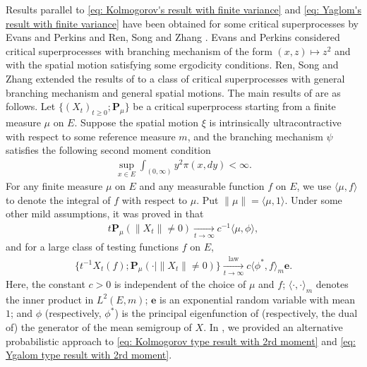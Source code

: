 \documentclass[UTF8]{pkuthss}
\theoremstyle{plain}
\theoremstyle{definition}
\numberwithin{equation}{section}
\begin{document}
	Results parallel to \eqref{eq: Kolmogorov's result with finite variance} and \eqref{eq: Yaglom's result with finite variance} have been obtained for some critical superprocesses by Evans and Perkins \cite{EvansPerkins1990Measurevalued} and Ren, Song and Zhang \cite{RenSongZhang2015Limit}.
	Evans and Perkins \cite{EvansPerkins1990Measurevalued} considered critical superprocesses with branching mechanism of the form $(x,z)\mapsto z^2$ and with the spatial motion satisfying some ergodicity conditions.
	Ren, Song and Zhang \cite{RenSongZhang2015Limit} extended the results of \cite{EvansPerkins1990Measurevalued} to a class of critical superprocesses with general branching mechanism and general spatial motions.
	The main results of \cite{RenSongZhang2015Limit} are as follows.
	Let $\{(X_t)_{t\geq 0}; \mathbf P_\mu \}$ be a critical superprocess starting from a finite measure $\mu$ on $E$.
	Suppose the spatial motion $\xi$ is intrinsically ultracontractive with respect to some reference measure $m$, and the branching mechanism $\psi$ satisfies the following second moment condition
\begin{align}\label{eq: second moment condition}
	\sup_{x\in E} \int_{(0,\infty)} y^2 \pi(x,dy)
	< \infty.
\end{align}
	For any finite measure $\mu$ on $E$ and any measurable function $f$ on $E$, we use $\langle \mu,f\rangle$ to denote the integral of $f$ with respect to $\mu$.
	Put $\|\mu\|=\langle \mu,1\rangle$.
	Under some other mild assumptions, it was proved in  \cite{RenSongZhang2015Limit} that
\begin{align}\label{eq: Kolmogorov type result with 2rd moment}
	t \mathbf P_\mu(\|X_t\| \neq 0)
	\xrightarrow[t\to \infty]{} c^{-1}
\langle \mu,\phi \rangle,
\end{align}
	and for a large class of testing functions $f$ on $E$,
\begin{align}\label{eq: Ygalom type result with 2rd moment}
	\{ t^{-1}X_t(f); \mathbf P_\mu (\cdot |\|X_t\| \neq 0)\}
	\xrightarrow[t\to \infty]{\operatorname{law}} c \langle \phi^*, f\rangle_m \mathbf e.
\end{align}
	Here, the constant $c > 0$ is independent of the choice of $\mu$ and $f$;
$\langle\cdot, \cdot \rangle_m$ denotes the inner product in $L^2(E, m)$;
	$\mathbf e$ is an exponential random variable with mean $1$;
	and $\phi$ (respectively, $\phi^*$) is the principal eigenfunction of (respectively, the dual of) the generator of the mean semigroup of $X$.
	In \cite{RenSongSun2019Spine}, we provided an alternative probabilistic approach to \eqref{eq: Kolmogorov type result with 2rd moment} and \eqref{eq: Ygalom type result with 2rd moment}.
	
\end{document}
